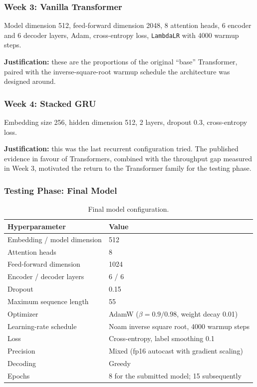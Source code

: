 \documentclass[11pt, oneside]{article}
\begin{document}
\subsubsection{Week 3: Vanilla Transformer}

Model dimension 512, feed-forward dimension 2048, 8 attention heads, 6 encoder and 6 decoder
layers, Adam, cross-entropy loss, \texttt{LambdaLR} with 4000 warmup steps.

\textbf{Justification:} these are the proportions of the original ``base'' Transformer, paired
with the inverse-square-root warmup schedule the architecture was designed around.

\subsubsection{Week 4: Stacked GRU}

Embedding size 256, hidden dimension 512, 2 layers, dropout 0.3, cross-entropy loss.

\textbf{Justification:} this was the last recurrent configuration tried. The published
evidence in favour of Transformers, combined with the throughput gap measured in Week 3,
motivated the return to the Transformer family for the testing phase.

\subsubsection{Testing Phase: Final Model}

\begin{table}[h!]
\centering
\small
\begin{tabular}{@{}ll@{}}
\toprule
Hyperparameter & Value \\
\midrule
Embedding / model dimension & 512 \\
Attention heads & 8 \\
Feed-forward dimension & 1024 \\
Encoder / decoder layers & 6 / 6 \\
Dropout & 0.15 \\
Maximum sequence length & 55 \\
Optimizer & AdamW ($\beta = 0.9/0.98$, weight decay 0.01) \\
Learning-rate schedule & Noam inverse square root, 4000 warmup steps \\
Loss & Cross-entropy, label smoothing 0.1 \\
Precision & Mixed (fp16 autocast with gradient scaling) \\
Decoding & Greedy \\
Epochs & 8 for the submitted model; 15 subsequently \\
\bottomrule
\end{tabular}
\caption{Final model configuration.}
\end{table}
\end{document}
